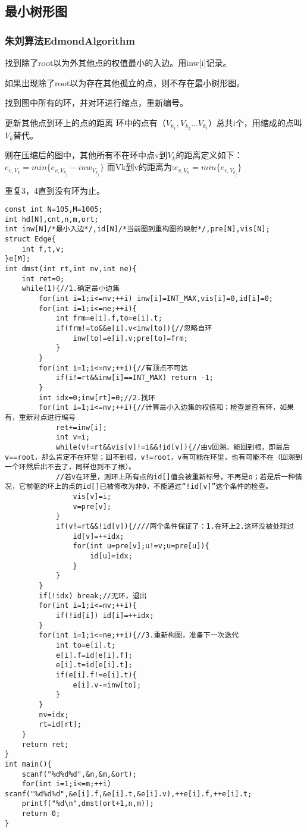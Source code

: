 \documentclass[UTF8]{ctexart}
\begin{document}
\subsection{最小树形图}
\subsubsection{朱刘算法EdmondAlgorithm}
找到除了root以为外其他点的权值最小的入边。用inw[i]记录。

如果出现除了root以为存在其他孤立的点，则不存在最小树形图。

找到图中所有的环，并对环进行缩点，重新编号。

更新其他点到环上的点的距离
环中的点有（$V_{k_1},V_{k_2}...V_{k_i}$）总共i个，用缩成的点叫$V_k$替代。

则在压缩后的图中，其他所有不在环中点v到$V_k$的距离定义如下：$e_{v,V_k}=min\{e_{v,V_{k_j}}-inw_{V_{k_j}}\}$
而Vk到v的距离为:$e_{v,V_k}=min\{e_{v,V_{k_j}}\}$


重复3，4直到没有环为止。
\begin{lstlisting}
const int N=105,M=1005;
int hd[N],cnt,n,m,ort;
int inw[N]/*最小入边*/,id[N]/*当前图到重构图的映射*/,pre[N],vis[N];
struct Edge{
    int f,t,v;
}e[M];
int dmst(int rt,int nv,int ne){
    int ret=0;
    while(1){//1.确定最小边集 
        for(int i=1;i<=nv;++i) inw[i]=INT_MAX,vis[i]=0,id[i]=0;
        for(int i=1;i<=ne;++i){
            int frm=e[i].f,to=e[i].t;
            if(frm!=to&&e[i].v<inw[to]){//忽略自环 
                inw[to]=e[i].v;pre[to]=frm;
            }
        }
        for(int i=1;i<=nv;++i){//有顶点不可达 
            if(i!=rt&&inw[i]==INT_MAX) return -1;
        }
        int idx=0;inw[rt]=0;//2.找环 
        for(int i=1;i<=nv;++i){//计算最小入边集的权值和；检查是否有环，如果有，重新对点进行编号
            ret+=inw[i];
            int v=i;
            while(v!=rt&&vis[v]!=i&&!id[v]){//由v回溯。能回到根，即最后v==root，那么肯定不在环里；回不到根，v!=root，v有可能在环里，也有可能不在（回溯到一个环然后出不去了，同样也到不了根）。
            //若v在环里，则环上所有点的id[]值会被重新标号，不再是o；若是后一种情况，它前驱的环上的点的id[]已被修改为非0，不能通过“!id[v]”这个条件的检查。
                vis[v]=i;
                v=pre[v];
            }
            if(v!=rt&&!id[v]){////两个条件保证了：1.在环上2.这环没被处理过
                id[v]=++idx;
                for(int u=pre[v];u!=v;u=pre[u]){
                    id[u]=idx;
                }
            }
        }
        if(!idx) break;//无环，退出
        for(int i=1;i<=nv;++i){
            if(!id[i]) id[i]=++idx;
        }
        for(int i=1;i<=ne;++i){//3.重新构图，准备下一次迭代 
            int to=e[i].t;
            e[i].f=id[e[i].f];
            e[i].t=id[e[i].t];
            if(e[i].f!=e[i].t){
                e[i].v-=inw[to];
            } 
        }
        nv=idx;
        rt=id[rt];
    }
    return ret;
}
int main(){
    scanf("%d%d%d",&n,&m,&ort);
    for(int i=1;i<=m;++i) scanf("%d%d%d",&e[i].f,&e[i].t,&e[i].v),++e[i].f,++e[i].t;
    printf("%d\n",dmst(ort+1,n,m));
    return 0;
}
\end{lstlisting}
\end{document}
